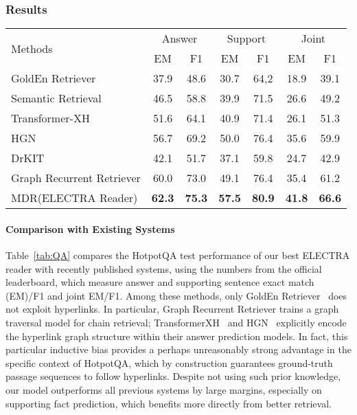 \documentclass{article} \usepackage{iclr2021_conference,times}
\newcommand{\method}{MDR\xspace}
\begin{document}
\subsubsection{Results}
\begin{table*}[h]
    \centering
    \small
    \vspace{-0.3in}
    \caption{HotpotQA-fullwiki test results.}
    \begin{tabular}{lcccccc}
    \toprule
       \multirow{2}{*}{Methods} &  \multicolumn{2}{c}{Answer} & \multicolumn{2}{c}{Support} & \multicolumn{2}{c}{Joint}\\ & EM & F1 & EM & F1 & EM & F1 \\
    \midrule
    GoldEn Retriever~\citep{GoldEn} & 37.9 & 48.6 & 30.7 & 64,2 & 18.9 & 39.1\\
    Semantic Retrieval~\citep{SMR} & 46.5 & 58.8 & 39.9 & 71.5 & 26.6 & 49.2\\
    Transformer-XH~\citep{Transformer-XH} & 51.6 & 64.1 & 40.9 & 71.4 & 26.1 & 51.3 \\
    HGN~\citep{HGN} & 56.7 & 69.2 & 50.0 & 76.4 & 35.6 & 59.9\\
    DrKIT~\citep{DrKIT} & 42.1 &  51.7 & 37.1 & 59.8 & 24.7 & 42.9\\
    Graph Recurrent Retriever \citep{GraphRecurrentRetriever} & 60.0 & 73.0 & 49.1 & 76.4 & 35.4 & 61.2 \\

    \midrule 
    \method (ELECTRA Reader) & \textbf{62.3} & \textbf{75.3} & \textbf{57.5} & \textbf{80.9} & \textbf{41.8} & \textbf{66.6}\\
    \bottomrule
    \end{tabular}
    \label{tab:QA}
    \vspace{-0.2in}
\end{table*} \paragraph{Comparison with Existing Systems} Table~\ref{tab:QA} compares the HotpotQA test performance of our best ELECTRA reader with recently published systems, using the numbers from the official leaderboard, which measure answer and supporting sentence exact match (EM)/F1 and joint EM/F1. 
Among these methods, only GoldEn Retriever~\citep{GoldEn} does not exploit hyperlinks. In particular, Graph Recurrent Retriever trains a graph traversal model for chain retrieval; TransformerXH~\citep{Transformer-XH} and HGN~\citep{HGN} explicitly encode the hyperlink graph structure within their answer prediction models. In fact, this particular inductive bias provides a perhaps unreasonably strong advantage in the specific context of HotpotQA, which by construction guarantees ground-truth passage sequences to follow hyperlinks.  
Despite not using such prior knowledge, our model outperforms all previous systems by large margins, especially on supporting fact prediction, which benefits more directly from better retrieval. 
\end{document}
